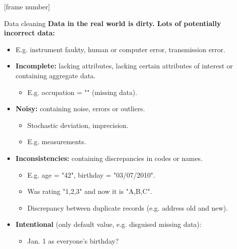 \documentclass[aspectratio=169,t]{beamer}
\begin{document}
  {
    [frame number]
    \begin{frame}{Data cleaning}
      \textbf{Data in the real world is {\color{airforceblue}dirty}. Lots of potentially incorrect data:}
      \begin{itemize}
        \item E.g. instrument faukty, human or computer error, transmission error.
        \item \textbf{\color{airforceblue}Incomplete:} lacking attributes, lacking certain attributes of interest or containing aggregate data.
        \begin{itemize}
          \item E.g. occupation = "" (missing data).
        \end{itemize}
        \item \textbf{\color{airforceblue}Noisy:} containing noise, errors or outliers.
        \begin{itemize}
          \item Stochastic deviation, imprecision.
          \item E.g. measurements.
        \end{itemize}
        \item \textbf{\color{airforceblue}Inconsistencies:} containing discrepancies in codes or names.
        \begin{itemize}
          \item E.g. age = "42", birthday = "03/07/2010".
          \item Was rating "1,2,3" and now it is "A,B,C".
          \item Discrepancy between duplicate records (e.g. address old and new).
        \end{itemize}
        \item \textbf{\color{airforceblue}Intentional} (only default value, e.g. disguised missing data):
        \begin{itemize}
          \item Jan. 1 as everyone's birthday?
        \end{itemize}
      \end{itemize}
    \end{frame}
  }
\end{document}

